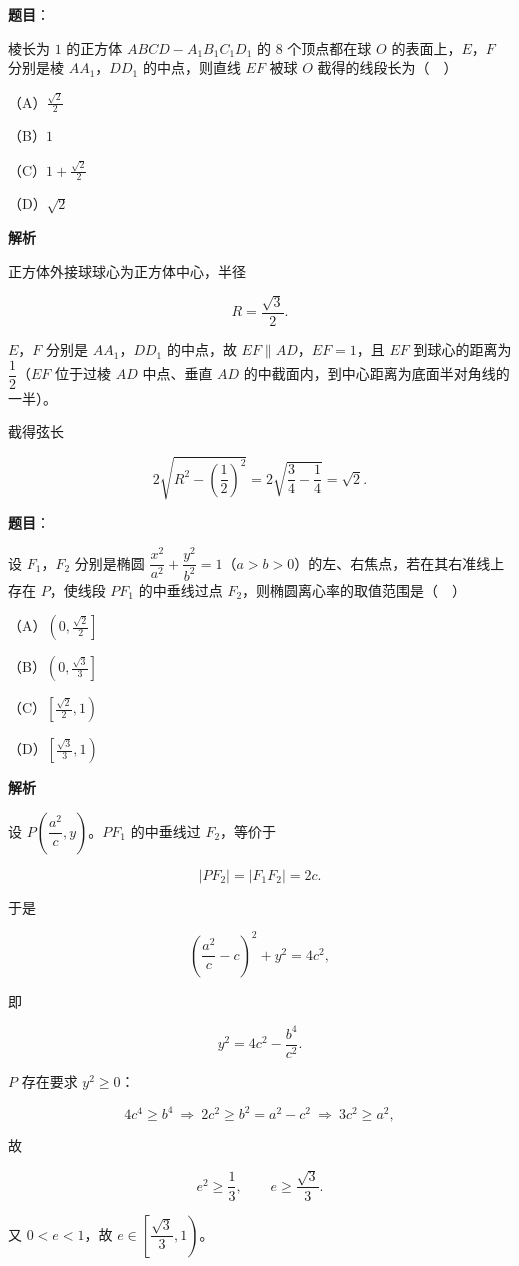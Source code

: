 \begin{answer}

\textbf{题目}：

棱长为 $1$ 的正方体 $ABCD-A_1B_1C_1D_1$ 的 $8$ 个顶点都在球 $O$ 的表面上，$E$，$F$ 分别是棱 $AA_1$，$DD_1$ 的中点，则直线 $EF$ 被球 $O$ 截得的线段长为（　）

（A）$\frac{\sqrt2}2$

（B）$1$

（C）$1+\frac{\sqrt2}2$

（D）$\sqrt2$

\textbf{解析}

正方体外接球球心为正方体中心，半径

\nopagebreak[4]
\[R=\frac{\sqrt3}2.\]

$E$，$F$ 分别是 $AA_1$，$DD_1$ 的中点，故 $EF\parallel AD$，$EF=1$，且 $EF$ 到球心的距离为 $\dfrac12$（$EF$ 位于过棱 $AD$ 中点、垂直 $AD$ 的中截面内，到中心距离为底面半对角线的一半）。

截得弦长

\nopagebreak[4]
\[2\sqrt{R^2-\left(\frac12\right)^2}=2\sqrt{\frac34-\frac14}=\sqrt2.\]


\end{answer}
\begin{answer}

\textbf{题目}：

设 $F_1$，$F_2$ 分别是椭圆 $\dfrac{x^2}{a^2}+\dfrac{y^2}{b^2}=1$（$a>b>0$）的左、右焦点，若在其右准线上存在 $P$，使线段 $PF_1$ 的中垂线过点 $F_2$，则椭圆离心率的取值范围是（　）

（A）$\left(0,\frac{\sqrt2}2\right]$

（B）$\left(0,\frac{\sqrt3}3\right]$

（C）$\left[\frac{\sqrt2}2,1\right)$

（D）$\left[\frac{\sqrt3}3,1\right)$

\textbf{解析}

设 $P\left(\dfrac{a^2}c,y\right)$。$PF_1$ 的中垂线过 $F_2$，等价于

\nopagebreak[4]
\[|PF_2|=|F_1F_2|=2c.\]

于是

\nopagebreak[4]
\[\left(\frac{a^2}c-c\right)^2+y^2=4c^2,\]

即

\nopagebreak[4]
\[y^2=4c^2-\frac{b^4}{c^2}.\]

$P$ 存在要求 $y^2\geqslant0$：

\nopagebreak[4]
\[4c^4\geqslant b^4\ \Longrightarrow\ 2c^2\geqslant b^2=a^2-c^2\ \Longrightarrow\ 3c^2\geqslant a^2,\]

故

\nopagebreak[4]
\[e^2\geqslant\frac13,\qquad e\geqslant\frac{\sqrt3}3.\]

又 $0<e<1$，故 $e\in\left[\dfrac{\sqrt3}3,1\right)$。


\end{answer}
